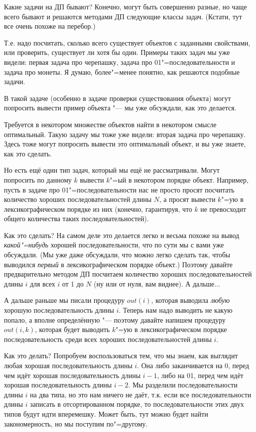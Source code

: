 Какие задачи на ДП бывают? Конечно, могут быть совершенно разные, но чаще
всего бывают и решаются методами ДП следующие классы задач. (Кстати, тут все очень похоже
на перебор.)

Т.е. надо посчитать, сколько всего существует объектов с заданными свойствами, или
проверить, существует ли хотя бы один. Примеры таких задач мы уже видели: первая задача
про черепашку, задача про 01"=последовательности и задача про монеты. Я думаю, более"=менее
понятно, как решаются подобные задачи.

В такой задаче (особенно в задаче проверки существования объекта) могут попросить вывести 
пример объекта "--- мы уже обсуждали, как это делается.

 Требуется в некотором множестве объектов найти
в некотором смысле оптимальный. Такую задачу мы тоже уже видели: вторая задача про черепашку.
Здесь тоже могут попросить вывести это оптимальный объект, и вы уже знаете, как это сделать.

 Но есть ещё один тип задач, который мы ещё не рассматривали. Могут попросить по данному
$k$ вывести $k$"=ый в некотором порядке объект. Например, пусть в задаче про
01"=последовательности нас не просто просят посчитать количество хороших последовательностей
длины $N$, а просят вывести $k$"=ую в лексикографическом порядке из них (конечно, гарантируя, что $k$ не превосходит общего количества таких последовательностей).

Как это сделать? На самом деле это делается легко и весьма похоже на вывод \textit{какой"=нибудь}
хорошей последовательности, что по сути мы с вами уже обсуждали. (Мы уже даже обсуждали, что
можно легко сделать так, чтобы выводился \textit{первый} в лексикографическом порядке объект.)
Поэтому давайте предварительно методом ДП посчитаем количество хороших последовательностей длины 
$i$ для всех $i$ от 1 до $N$ (ну или от нуля, вам виднее). А дальше...

А дальше раньше мы писали процедуру $out(i)$, которая выводила \textit{любую} хорошую
последовательность длины $i$. Теперь нам надо выводить не какую попало, а вполне определённую
"--- поэтому давайте напишем процедуру $out(i,k)$, которая будет выводить $k$"=ую
в лексикографическом порядке последовательность среди всех хороших последовательностей длины
$i$.

Как это делать? Попробуем воспользоваться тем, что мы знаем, как выглядит любая хорошая последовательность длины $i$. Она либо заканчивается на 0, перед чем идёт хорошая
последовательность длины $i-1$, либо на 01, перед чем идёт хорошая последовательность
длины $i-2$. Мы разделили последовательности длины $i$ на два типа, но это нам ничего не даёт, 
т.к. если все последовательности длины $i$ записать в отсортированном порядке, то
последовательности этих двух типов будут идти вперемешку. Может быть, тут можно будет найти
закономерность, но мы поступим по"=другому.

